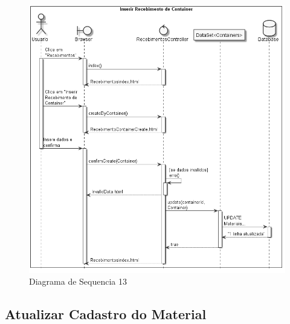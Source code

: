 \documentclass[rascunho,xindy,acronym,symbols]{fei}
\begin{document}
\begin{figure}[H]
    \centering
    \includegraphics[width=\textwidth]{./Images/DS_Inserir_Recebimento_Container.jpg}
    \caption{Diagrama de Sequencia 13}
    \label{fig:diag_seq13}
\end{figure}

\subsection{Atualizar Cadastro do Material}
\end{document}
